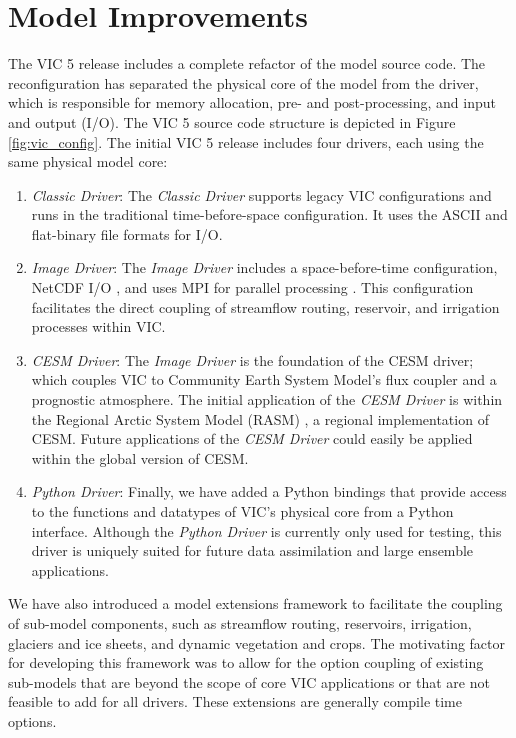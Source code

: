 \documentclass[gmd, manuscript]{copernicus}
\begin{document}
\section{Model Improvements}
  \label{sec:improvements}
  The VIC 5 release includes a complete refactor of the model source code.
  The reconfiguration has separated the physical core of the model from the driver, which is responsible for memory allocation, pre- and post-processing, and input and output (I/O).
  The VIC 5 source code structure is depicted in Figure \ref{fig:vic_config}.
  The initial VIC 5 release includes four drivers, each using the same physical model core:
  \begin{enumerate}
    \item \textit{Classic Driver}: The \textit{Classic Driver} supports legacy VIC configurations and runs in the traditional time-before-space configuration.
    It uses the ASCII and flat-binary file formats for I/O.
    \item \textit{Image Driver}: The \textit{Image Driver} includes a space-before-time configuration, NetCDF I/O \citep{Rew_1990}, and uses MPI for parallel processing \citep{Gropp_1996}.
    This configuration facilitates the direct coupling of streamflow routing, reservoir, and irrigation processes within VIC.
    \item \textit{CESM Driver}: The \textit{Image Driver} is the foundation of the CESM driver; which couples VIC to Community Earth System Model's \citep[CESM;][]{Hurrell_2013} flux coupler \citep[CPL7;][]{Craig_2012} and a prognostic atmosphere.
    The initial application of the \textit{CESM Driver} is within the Regional Arctic System Model (RASM) \citep{Hamman_2016a}, a regional implementation of CESM.
    Future applications of the \textit{CESM Driver} could easily be applied within the global version of CESM.
    \item \textit{Python Driver}: Finally, we have added a Python bindings that provide access to the functions and datatypes of VIC’s physical core from a Python interface.
    Although the \textit{Python Driver} is currently only used for testing, this driver is uniquely suited for future data assimilation and large ensemble applications.
  \end{enumerate}

  We have also introduced a model extensions framework to facilitate the coupling of sub-model components, such as streamflow routing, reservoirs, irrigation, glaciers and ice sheets, and dynamic vegetation and crops.
  The motivating factor for developing this framework was to allow for the option coupling of existing sub-models that are beyond the scope of core VIC applications or that are not feasible to add for all drivers.
  These extensions are generally compile time options.
\end{document}
